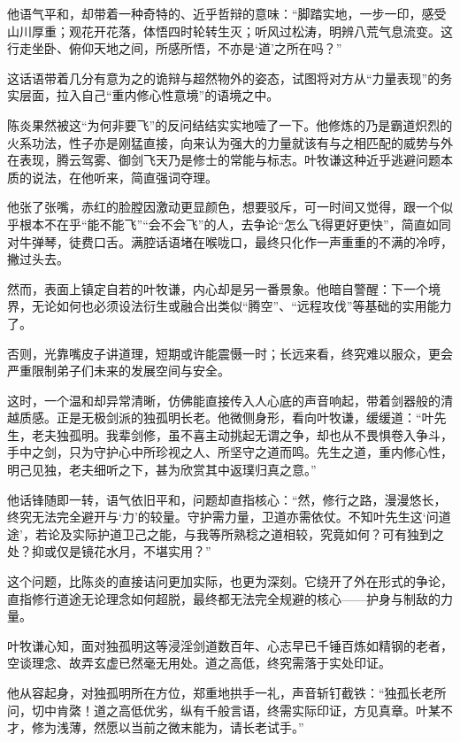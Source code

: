 他语气平和，却带着一种奇特的、近乎哲辩的意味：“脚踏实地，一步一印，感受山川厚重；观花开花落，体悟四时轮转生灭；听风过松涛，明辨八荒气息流变。这行走坐卧、俯仰天地之间，所感所悟，不亦是‘道’之所在吗？”

这话语带着几分有意为之的诡辩与超然物外的姿态，试图将对方从“力量表现”的务实层面，拉入自己“重内修心性意境”的语境之中。

陈炎果然被这“为何非要飞”的反问结结实实地噎了一下。他修炼的乃是霸道炽烈的火系功法，性子亦是刚猛直接，向来认为强大的力量就该有与之相匹配的威势与外在表现，腾云驾雾、御剑飞天乃是修士的常能与标志。叶牧谦这种近乎逃避问题本质的说法，在他听来，简直强词夺理。

他张了张嘴，赤红的脸膛因激动更显颜色，想要驳斥，可一时间又觉得，跟一个似乎根本不在乎“能不能飞”“会不会飞”的人，去争论“怎么飞得更好更快”，简直如同对牛弹琴，徒费口舌。满腔话语堵在喉咙口，最终只化作一声重重的不满的冷哼，撇过头去。

然而，表面上镇定自若的叶牧谦，内心却是另一番景象。他暗自警醒：下一个境界，无论如何也必须设法衍生或融合出类似“腾空”、“远程攻伐”等基础的实用能力了。

否则，光靠嘴皮子讲道理，短期或许能震慑一时；长远来看，终究难以服众，更会严重限制弟子们未来的发展空间与安全。

\vspace{2em}

这时，一个温和却异常清晰，仿佛能直接传入人心底的声音响起，带着剑器般的清越质感。正是无极剑派的独孤明长老。他微侧身形，看向叶牧谦，缓缓道：“叶先生，老夫独孤明。我辈剑修，虽不喜主动挑起无谓之争，却也从不畏惧卷入争斗，手中之剑，只为守护心中所珍视之人、所坚守之道而鸣。先生之道，重内修心性，明己见独，老夫细听之下，甚为欣赏其中返璞归真之意。”

他话锋随即一转，语气依旧平和，问题却直指核心：“然，修行之路，漫漫悠长，终究无法完全避开与‘力’的较量。守护需力量，卫道亦需依仗。不知叶先生这‘问道途’，若论及实际护道卫己之能，与我等所熟稔之道相较，究竟如何？可有独到之处？抑或仅是镜花水月，不堪实用？”

这个问题，比陈炎的直接诘问更加实际，也更为深刻。它绕开了外在形式的争论，直指修行道途无论理念如何超脱，最终都无法完全规避的核心——护身与制敌的力量。

叶牧谦心知，面对独孤明这等浸淫剑道数百年、心志早已千锤百炼如精钢的老者，空谈理念、故弄玄虚已然毫无用处。道之高低，终究需落于实处印证。

他从容起身，对独孤明所在方位，郑重地拱手一礼，声音斩钉截铁：“独孤长老所问，切中肯綮！道之高低优劣，纵有千般言语，终需实际印证，方见真章。叶某不才，修为浅薄，然愿以当前之微末能为，请长老试手。”

